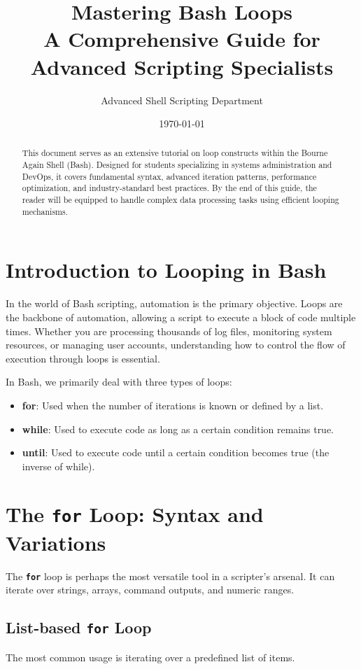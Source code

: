 \documentclass[12pt,a4paper]{article}
\title{
	\vspace{2cm}
	\textbf{\Huge Mastering Bash Loops}\\
	\large A Comprehensive Guide for Advanced Scripting Specialists
}
\author{Advanced Shell Scripting Department}
\date{\today}
\newcommand{\bashcmd}[1]{\texttt{\textbf{#1}}}
\begin{document}
	
	\maketitle
	\vfill
	\begin{abstract}
		This document serves as an extensive tutorial on loop constructs within the Bourne Again Shell (Bash). Designed for students specializing in systems administration and DevOps, it covers fundamental syntax, advanced iteration patterns, performance optimization, and industry-standard best practices. By the end of this guide, the reader will be equipped to handle complex data processing tasks using efficient looping mechanisms.
	\end{abstract}
	\vfill
	\newpage
	
	\tableofcontents
	\newpage
	
	\section{Introduction to Looping in Bash}
	In the world of Bash scripting, automation is the primary objective. Loops are the backbone of automation, allowing a script to execute a block of code multiple times. Whether you are processing thousands of log files, monitoring system resources, or managing user accounts, understanding how to control the flow of execution through loops is essential.
	
	In Bash, we primarily deal with three types of loops:
	\begin{itemize}
		\item \textbf{for}: Used when the number of iterations is known or defined by a list.
		\item \textbf{while}: Used to execute code as long as a certain condition remains true.
		\item \textbf{until}: Used to execute code until a certain condition becomes true (the inverse of while).
	\end{itemize}
	
	\section{The \texttt{for} Loop: Syntax and Variations}
	The \bashcmd{for} loop is perhaps the most versatile tool in a scripter's arsenal. It can iterate over strings, arrays, command outputs, and numeric ranges.
	
	\subsection{List-based \texttt{for} Loop}
	The most common usage is iterating over a predefined list of items.
	
\end{document}
